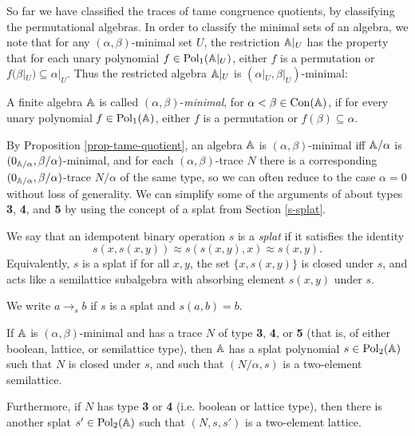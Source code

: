 \begin{appendices}
So far we have classified the traces of tame congruence quotients, by classifying the permutational algebras. In order to classify the minimal sets of an algebra, we note that for any $(\alpha,\beta)$-minimal set $U$, the restriction $\mathbb{A}|_U$ has the property that for each unary polynomial $f \in \operatorname{Pol}_1(\mathbb{A}|_U)$, either $f$ is a permutation or $f(\beta|_U) \subseteq \alpha|_U$. Thus the restricted algebra $\mathbb{A}|_U$ is $(\alpha|_U,\beta|_U)$-minimal:

\begin{defn} A finite algebra $\mathbb{A}$ is called $(\alpha,\beta)$-\emph{minimal}, for $\alpha < \beta \in \operatorname{Con}(\mathbb{A})$, if for every unary polynomial $f \in \operatorname{Pol}_1(\mathbb{A})$, either $f$ is a permutation or $f(\beta) \subseteq \alpha$.
\end{defn}

By Proposition \ref{prop-tame-quotient}, an algebra $\mathbb{A}$ is $(\alpha,\beta)$-minimal iff $\mathbb{A}/\alpha$ is $(0_{\mathbb{A}/\alpha}, \beta/\alpha)$-minimal, and for each $(\alpha,\beta)$-trace $N$ there is a corresponding $(0_{\mathbb{A}/\alpha},\beta/\alpha)$-trace $N/\alpha$ of the same type, so we can often reduce to the case $\alpha = 0$ without loss of generality. We can simplify some of the arguments of \cite{hobby-mckenzie} about types \textbf{3}, \textbf{4}, and \textbf{5} by using the concept of a splat from Section \ref{s-splat}.

\begin{defn} We say that an idempotent binary operation $s$ is a \emph{splat} if it satisfies the identity
\[
s(x,s(x,y)) \approx s(s(x,y),x) \approx s(x,y).
\]
Equivalently, $s$ is a splat if for all $x,y$, the set $\{x,s(x,y)\}$ is closed under $s$, and acts like a semilattice subalgebra with absorbing element $s(x,y)$ under $s$.

We write $a \rightarrow_s b$ if $s$ is a splat and $s(a,b) = b$.
\end{defn}

\begin{prop}\label{prop-tame-splat} If $\mathbb{A}$ is $(\alpha,\beta)$-minimal and has a trace $N$ of type \textbf{3}, \textbf{4}, or \textbf{5} (that is, of either boolean, lattice, or semilattice type), then $\mathbb{A}$ has a splat polynomial $s \in \operatorname{Pol}_2(\mathbb{A})$ such that $N$ is closed under $s$, and such that $(N/\alpha, s)$ is a two-element semilattice.

Furthermore, if $N$ has type  \textbf{3} or \textbf{4} (i.e. boolean or lattice type), then there is another splat $s' \in \operatorname{Pol}_2(\mathbb{A})$ such that $(N, s, s')$ is a two-element lattice.


\end{prop}
\end{appendices}
